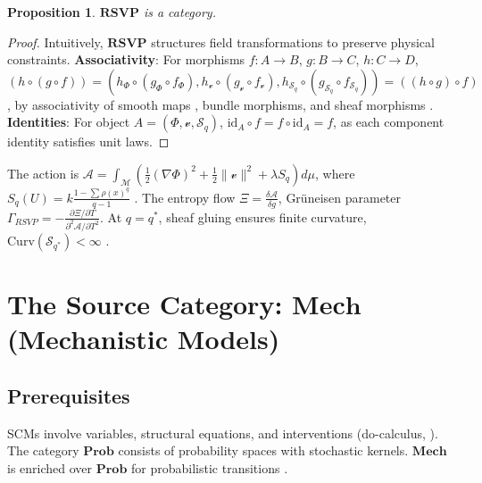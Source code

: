 \documentclass{article}
\theoremstyle{plain}
\newtheorem{proposition}[theorem]{Proposition}
\theoremstyle{definition}
\begin{document}
\begin{proposition}
$\mathbf{RSVP}$ is a category.
\end{proposition}
\begin{proof}
Intuitively, $\mathbf{RSVP}$ structures field transformations to preserve physical constraints. \textbf{Associativity}: For morphisms $f: A \to B$, $g: B \to C$, $h: C \to D$, $(h \circ (g \circ f)) = (h_\Phi \circ (g_\Phi \circ f_\Phi), h_\mathcal{v} \circ (g_\mathcal{v} \circ f_\mathcal{v}), h_{\mathcal{S}_q} \circ (g_{\mathcal{S}_q} \circ f_{\mathcal{S}_q})) = ((h \circ g) \circ f)$, by associativity of smooth maps \cite{Kock2004}, bundle morphisms, and sheaf morphisms \cite{MacLane1992}. \textbf{Identities}: For object $A = (\Phi, \mathcal{v}, \mathcal{S}_q)$, $\text{id}_A \circ f = f \circ \text{id}_A = f$, as each component identity satisfies unit laws.
\end{proof}

The action is $\mathcal{A} = \int_{\mathcal{M}} \left( \frac{1}{2}(\nabla \Phi)^2 + \frac{1}{2}\|\mathcal{v}\|^2 + \lambda S_q \right) d\mu$, where $S_q(U) = k \frac{1 - \sum \rho(x)^q}{q-1}$ \cite{Tsallis1988}. The entropy flow $\Xi = \frac{\delta \mathcal{A}}{\delta g}$, Gr\"uneisen parameter $\Gamma_{RSVP} = - \frac{\partial \Xi / \partial T}{\partial^2 \mathcal{A} / \partial T^2}$. At $q = q^*$, sheaf gluing ensures finite curvature, $\text{Curv}(\mathcal{S}_{q^*}) < \infty$ \cite{Soares2024}.

\section{The Source Category: $\mathbf{Mech}$ (Mechanistic Models)}

\subsection{Prerequisites}
SCMs involve variables, structural equations, and interventions (do-calculus, \cite{Pearl2009}). The category $\mathbf{Prob}$ consists of probability spaces with stochastic kernels. $\mathbf{Mech}$ is enriched over $\mathbf{Prob}$ for probabilistic transitions \cite{Lawvere2009}.
\end{document}
